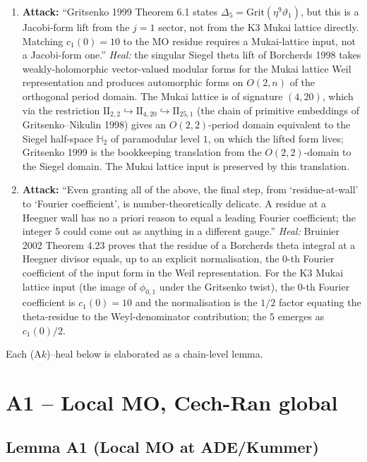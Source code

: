 \begin{enumerate}
\item[(A4)]
   \textbf{Attack:} ``Gritsenko 1999 Theorem 6.1 states
   $\Delta_5 = \mathrm{Grit}(\eta^{9} \vartheta_{1})$, but this is a
   Jacobi-form lift from the $j = 1$ sector, not from the K3 Mukai
   lattice directly.  Matching $c_1(0) = 10$ to the MO residue
   requires a Mukai-lattice input, not a Jacobi-form one.''
   \emph{Heal:} the singular Siegel theta lift of Borcherds 1998
   takes weakly-holomorphic vector-valued modular forms for the
   Mukai lattice Weil representation and produces automorphic
   forms on $O(2, n)$ of the orthogonal period domain.  The
   Mukai lattice is of signature $(4, 20)$, which via the
   restriction $\mathrm{II}_{2, 2} \hookrightarrow
   \mathrm{II}_{4, 20} \hookrightarrow \mathrm{II}_{25, 1}$ (the
   chain of primitive embeddings of Gritsenko--Nikulin 1998) gives
   an $O(2, 2)$-period domain equivalent to the Siegel half-space
   $\mathbb H_{2}$ of paramodular level $1$, on which the lifted
   form lives; Gritsenko 1999 is the bookkeeping translation from
   the $O(2, 2)$-domain to the Siegel domain.  The Mukai lattice
   input is preserved by this translation.

\item[(A5)]
   \textbf{Attack:} ``Even granting all of the above, the final
   step, from `residue-at-wall' to `Fourier coefficient', is
   number-theoretically delicate.  A residue at a Heegner wall has
   no a priori reason to equal a leading Fourier coefficient; the
   integer $5$ could come out as anything in a different gauge.''
   \emph{Heal:} Bruinier 2002 Theorem 4.23 proves that the
   residue of a Borcherds theta integral at a Heegner divisor
   equals, up to an explicit normalisation, the $0$-th Fourier
   coefficient of the input form in the Weil representation.  For
   the K3 Mukai lattice input (the image of $\phi_{0, 1}$ under the
   Gritsenko twist), the $0$-th Fourier coefficient is $c_1(0) = 10$
   and the normalisation is the $1/2$ factor equating the
   theta-residue to the Weyl-denominator contribution; the $5$
   emerges as $c_1(0)/2$.
\end{enumerate}

Each (A$k$)--heal below is elaborated as a chain-level lemma.

\section*{A1 -- Local MO, Cech-Ran global}

\subsection*{Lemma A1 (Local MO at ADE/Kummer)}

